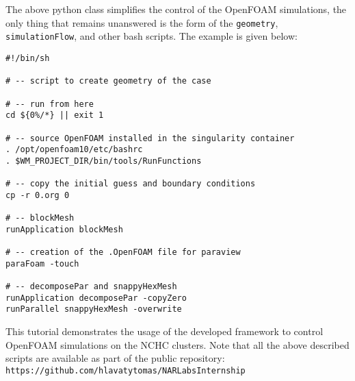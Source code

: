The above python class simplifies the control of the OpenFOAM simulations, the only thing that remains unanswered is the form of the \texttt{geometry}, \texttt{simulationFlow}, and other bash scripts. The example is given below:
\begin{verbatim}
#!/bin/sh

# -- script to create geometry of the case

# -- run from here
cd ${0%/*} || exit 1

# -- source OpenFOAM installed in the singularity container
. /opt/openfoam10/etc/bashrc
. $WM_PROJECT_DIR/bin/tools/RunFunctions

# -- copy the initial guess and boundary conditions
cp -r 0.org 0

# -- blockMesh
runApplication blockMesh

# -- creation of the .OpenFOAM file for paraview
paraFoam -touch

# -- decomposePar and snappyHexMesh
runApplication decomposePar -copyZero
runParallel snappyHexMesh -overwrite
\end{verbatim} 

This tutorial demonstrates the usage of the developed framework to control OpenFOAM simulations on the NCHC clusters. Note that all the above described scripts are available as part of the public repository:\\[0.2cm] \indent\quad\quad\texttt{https://github.com/hlavatytomas/NARLabsInternship}